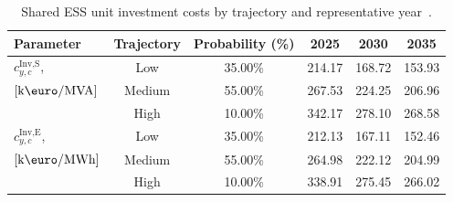 \documentclass[preprint,12pt]{elsarticle}
\providecommand{\DIFaddbegin}{} %
\providecommand{\DIFaddend}{} %
\providecommand{\DIFdelbegin}{} %
\providecommand{\DIFdelend}{} %
\begin{document}
\DIFdelbegin %
\DIFdelend \DIFaddbegin \begin{table}[htbp!]
    \centering    
    \caption{Shared ESS unit investment costs by trajectory and representative year~\cite{nrel_ess_costs}.}
    \begin{tabular}{lcc ccc}
        \toprule
        Parameter & Trajectory & Probability (\%) & 2025 & 2030 & 2035 \\
        \midrule
        $c^\text{Inv,S}_{y,c}$,             & Low       & 35.00\% & 214.17 & 168.72 & 153.93\\
        $\left[\text{k\euro/MVA}\right]$    & Medium    & 55.00\% & 267.53 & 224.25 & 206.96\\
        ~                                   & High      & 10.00\% & 342.17 & 278.10 & 268.58\\
        \midrule
        $c^\text{Inv,E}_{y,c}$,             & Low       & 35.00\% & 212.13 & 167.11 & 152.46\\
        $\left[\text{k\euro/MWh}\right]$    & Medium    & 55.00\% & 264.98 & 222.12 & 204.99\\
        ~                                   & High      & 10.00\% & 338.91 & 275.45 & 266.02\\
        \bottomrule
    \end{tabular}
    \label{tab:investment_cost}
\end{table}
\DIFaddend 
\end{document}
